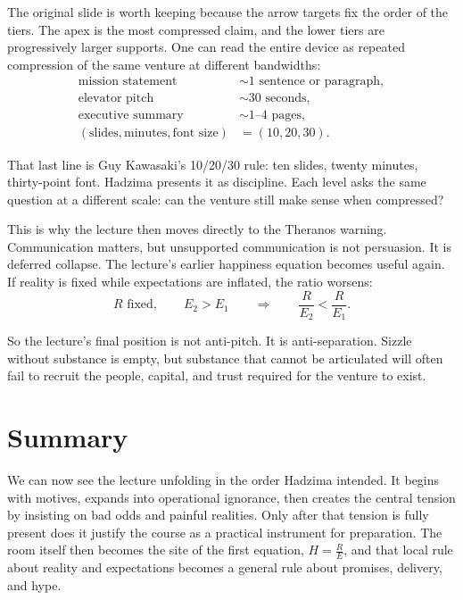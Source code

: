 The original slide is worth keeping because the arrow targets fix the order of the tiers. The apex is the most compressed claim, and the lower tiers are progressively larger supports. One can read the entire device as repeated compression of the same venture at different bandwidths:
\begin{align}
\text{mission statement} &\sim \text{1 sentence or paragraph}, \\
\text{elevator pitch} &\sim 30\text{ seconds}, \\
\text{executive summary} &\sim 1\text{--}4\text{ pages}, \\
(\text{slides},\text{minutes},\text{font size}) &= (10,20,30).
\end{align}

That last line is Guy Kawasaki's 10/20/30 rule: ten slides, twenty minutes, thirty-point font. Hadzima presents it as discipline. Each level asks the same question at a different scale: can the venture still make sense when compressed?

This is why the lecture then moves directly to the Theranos warning. Communication matters, but unsupported communication is not persuasion. It is deferred collapse. The lecture's earlier happiness equation becomes useful again. If reality is fixed while expectations are inflated, the ratio worsens:
\begin{equation}
R \text{ fixed},\qquad E_2>E_1 \qquad \Longrightarrow \qquad \frac{R}{E_2}<\frac{R}{E_1}.
\end{equation}

So the lecture's final position is not anti-pitch. It is anti-separation. Sizzle without substance is empty, but substance that cannot be articulated will often fail to recruit the people, capital, and trust required for the venture to exist.

\section{Summary}

We can now see the lecture unfolding in the order Hadzima intended. It begins with motives, expands into operational ignorance, then creates the central tension by insisting on bad odds and painful realities. Only after that tension is fully present does it justify the course as a practical instrument for preparation. The room itself then becomes the site of the first equation, \(H=\frac{R}{E}\), and that local rule about reality and expectations becomes a general rule about promises, delivery, and hype.


